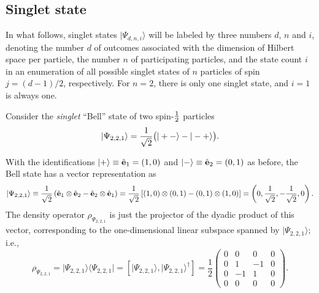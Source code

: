 \documentclass[pra,amsfonts,showpacs,showkeys,preprint]{revtex4}
\begin{document}
\subsection{Singlet state}




In what follows, singlet states $\vert \Psi_{d,n,i} \rangle$ will be labeled by three numbers $d$, $n$ and $i$,
denoting
the number $d$ of outcomes associated with the dimension of Hilbert space per particle,
the number $n$ of participating particles,
and the state count $i$ in an enumeration of all possible singlet states of $n$ particles of spin $j=(d-1)/2$, respectively.
For $n=2$, there is only one singlet state, and $i=1$ is always one.

Consider the {\em singlet} ``Bell'' state of two spin-${1\over 2}$
particles
\begin{equation}
\vert \Psi_{2,2,1} \rangle
=
 {1\over \sqrt{2}}
\bigl(
\vert +- \rangle -
\vert -+ \rangle
\bigr)
.
\label{2009-gtq-s1s21}
\end{equation}

With the identifications
$
\vert +\rangle
\equiv {\hat {\bf e}}_1 =(1,0)
$
and
$
\vert -\rangle \equiv {\hat {\bf e}}_2 =(0,1)
$ as before,
the Bell state has a vector representation as
\begin{equation}
\vert  \Psi_{2,2,1}\rangle
 \equiv
{1\over \sqrt{2}}\left({\hat {\bf e}}_1\otimes {\hat {\bf e}}_2-{\hat {\bf e}}_2\otimes {\hat {\bf e}}_1 \right)
= {1\over \sqrt{2}}\left[ (1,0)\otimes (0,1) - (0,1) \otimes (1,0)\right]
=\left( 0,\frac{1}{\sqrt{2}},- \frac{1}{\sqrt{2}} ,  0 \right).
\label{2005-hp-ep12s1v}
\end{equation}
The density operator $\rho_{\Psi_{2,2,1}}$
is just the projector of the dyadic product of this vector, corresponding to the one-dimensional
linear subspace spanned by  $\vert  \Psi_{2,2,1}\rangle $; i.e.,
\begin{equation}
\rho_{\Psi_{2,2,1}} = \vert  \Psi_{2,2,1}\rangle \langle  \Psi_{2,2,1} \vert
=
\left[ \vert  \Psi_{2,2,1}\rangle ,\vert  \Psi_{2,2,1}\rangle^\dagger \right]
=
\frac{1}{2}
 \left(
\begin{array}{rrrr}
0&0&0&0\\
0&1&-1&0\\
0&-1&1&0\\
0&0&0&0
\end{array}
\right)
.
\end{equation}
\end{document}
